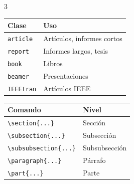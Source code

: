 \documentclass[10pt,landscape]{article}
\newcommand{\comando}[1]{\texttt{\textcolor{azulprofundo}{#1}}}
\begin{document}
\begin{multicols}{3}
\begin{tabular}{@{}ll@{}}
    \toprule
    \textbf{Clase} & \textbf{Uso} \\
    \midrule
    \comando{article} & Artículos, informes cortos \\
    \comando{report} & Informes largos, tesis \\
    \comando{book} & Libros \\
    \comando{beamer} & Presentaciones \\
    \comando{IEEEtran} & Artículos IEEE \\
    \bottomrule
\end{tabular}

\vspace{0.5cm}

\tcbox[colback=grisclaro, colframe=azulprofundo, arc=3pt, boxsep=2pt, left=2pt, right=2pt, top=2pt, bottom=2pt]{
    \textbf{\textcolor{azulprofundo}{📑 SECCIONES}}
}
\vspace{0.3cm}

\begin{tabular}{@{}ll@{}}
    \toprule
    \textbf{Comando} & \textbf{Nivel} \\
    \midrule
    \comando{\textbackslash section\{...\}} & Sección \\
    \comando{\textbackslash subsection\{...\}} & Subsección \\
    \comando{\textbackslash subsubsection\{...\}} & Subsubsección \\
    \comando{\textbackslash paragraph\{...\}} & Párrafo \\
    \comando{\textbackslash part\{...\}} & Parte \\
    \bottomrule
\end{tabular}

\vspace{0.5cm}

\tcbox[colback=grisclaro, colframe=azulprofundo, arc=3pt, boxsep=2pt, left=2pt, right=2pt, top=2pt, bottom=2pt]{
    \textbf{\textcolor{azulprofundo}{✏️ FORMATO DE TEXTO}}
}
\vspace{0.3cm}


\end{multicols}
\end{document}
